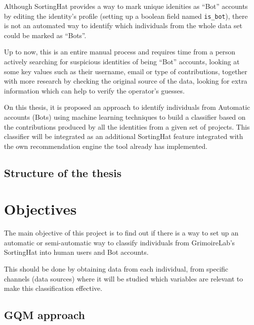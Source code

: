 \documentclass[a4paper, 12pt]{book}
\begin{document}
Although SortingHat provides a way to mark unique idenities as “Bot” accounts by editing the identity’s profile (setting up a boolean field named \texttt{is\_bot}), there is not an automated way to identify which individuals from the whole data set could be marked as “Bots”.

Up to now, this is an entire manual process and requires time from a person actively searching for suspicious identities of being “Bot” accounts, looking at some key values such as their username, email or type of contributions, together with more research by checking the original source of the data, looking for extra information which can help to verify the operator’s guesses.

On this thesis, it is proposed an approach to identify individuals from Automatic accounts (Bots) using machine learning techniques to build a classifier based on the contributions produced by all the identities from a given set of projects. This classifier will be integrated as an additional SortingHat feature integrated with the own recommendation engine the tool already has implemented.

\section{Structure of the thesis}
\label{sec:structure}



\cleardoublepage
\chapter{Objectives}
\label{sec:objectives}

The main objective of this project is to find out if there is a way to set up an automatic or semi-automatic way to classify individuals from GrimoireLab’s SortingHat into human users and Bot accounts.

This should be done by obtaining data from each individual, from specific channels (data sources) where it will be studied which variables are relevant to make this classification effective.

\section{GQM approach}
\end{document}
